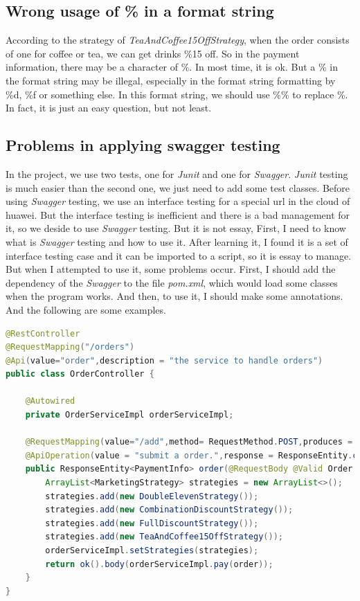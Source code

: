 \documentclass[a4paper]{report}
\begin{document}
\subsection{Wrong usage of \% in a format string}
\par According to the strategy of \emph{TeaAndCoffee15OffStrategy}, when the order consists of one for coffee or tea, we can get drinks \%15 off. So in the payment information, there may be a character of \%. In most time, it is ok. But a \% in the format string may be illegal, especially in the format string formatting by \%d, \%f or something else. In this format string, we should use \%\% to replace \%. In fact, it is just an easy question, but not least.
\subsection{Problems in applying swagger testing}
\par In the project, we use two tests, one for \emph{Junit} and one for \emph{Swagger}. \emph{Junit} testing is much easier than the second one, we just need to add some test classes. Before using \emph{Swagger} testing, we use an interface testing for a special url in the cloud of huawei. But the interface testing is inefficient and there is a bad management for it, so we deside to use \emph{Swagger} testing. But it is not essay, First, I need to know what is \emph{Swagger} testing and how to use it. After learning it, I found it is a set of interface testing case and it can be imported to a script, so it is essay to manage. But when I attempted to use it, some problems occur. First, I should add the dependency of the \emph{Swagger} to the file \emph{pom.xml}, which would load some classes when the program works. And then, to use it, I should make some annotations. And the following are some examples.
\begin{lstlisting}[language=java]
@RestController
@RequestMapping("/orders")
@Api(value="order",description = "the service to handle orders")
public class OrderController {

    @Autowired
    private OrderServiceImpl orderServiceImpl;

    @RequestMapping(value="/add",method= RequestMethod.POST,produces = "application/json")
    @ApiOperation(value = "submit a order.",response = ResponseEntity.class)
    public ResponseEntity<PaymentInfo> order(@RequestBody @Valid Order order) {
        ArrayList<MarketingStrategy> strategies = new ArrayList<>();
        strategies.add(new DoubleElevenStrategy());
        strategies.add(new CombinationDiscountStrategy());
        strategies.add(new FullDiscountStrategy());
        strategies.add(new TeaAndCoffee15OffStrategy());
        orderServiceImpl.setStrategies(strategies);
        return ok().body(orderServiceImpl.pay(order));
    }
}
\end{lstlisting}
\end{document}
